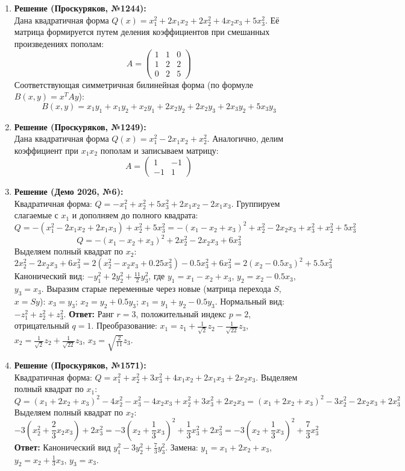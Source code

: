 \begin{enumerate}
    \item \textbf{Решение (Проскуряков, №1244):}\\
    Дана квадратичная форма $Q(x) = x_1^2 + 2x_1 x_2 + 2x_2^2 + 4x_2 x_3 + 5x_3^2$.
    Её матрица формируется путем деления коэффициентов при смешанных произведениях пополам:
    $$A = \begin{pmatrix} 1 & 1 & 0 \\ 1 & 2 & 2 \\ 0 & 2 & 5 \end{pmatrix}$$
    Соответствующая симметричная билинейная форма (по формуле $B(x,y) = x^T A y$):
    $$B(x,y) = x_1 y_1 + x_1 y_2 + x_2 y_1 + 2x_2 y_2 + 2x_2 y_3 + 2x_3 y_2 + 5x_3 y_3$$

    \item \textbf{Решение (Проскуряков, №1249):}\\
    Дана квадратичная форма $Q(x) = x_1^2 - 2x_1 x_2 + x_2^2$.
    Аналогично, делим коэффициент при $x_1 x_2$ пополам и записываем матрицу:
    $$A = \begin{pmatrix} 1 & -1 \\ -1 & 1 \end{pmatrix}$$

    \item \textbf{Решение (Демо 2026, №6):}\\
    Квадратичная форма: $Q = -x_1^2 + x_2^2 + 5x_3^2 + 2x_1 x_2 - 2x_1 x_3$.
    Группируем слагаемые с $x_1$ и дополняем до полного квадрата:
    $$Q = -(x_1^2 - 2x_1 x_2 + 2x_1 x_3) + x_2^2 + 5x_3^2 = -(x_1 - x_2 + x_3)^2 + x_2^2 - 2x_2 x_3 + x_3^2 + x_2^2 + 5x_3^2$$
    $$Q = -(x_1 - x_2 + x_3)^2 + 2x_2^2 - 2x_2 x_3 + 6x_3^2$$
    Выделяем полный квадрат по $x_2$:
    $$2x_2^2 - 2x_2 x_3 + 6x_3^2 = 2(x_2^2 - x_2 x_3 + 0.25x_3^2) - 0.5x_3^2 + 6x_3^2 = 2(x_2 - 0.5x_3)^2 + 5.5x_3^2$$
    Канонический вид: $-y_1^2 + 2y_2^2 + \frac{11}{2}y_3^2$, где $y_1 = x_1 - x_2 + x_3$, $y_2 = x_2 - 0.5x_3$, $y_3 = x_3$.
    Выразим старые переменные через новые (матрица перехода $S$, $x = Sy$):
    $x_3 = y_3$; \quad $x_2 = y_2 + 0.5y_3$; \quad $x_1 = y_1 + y_2 - 0.5y_3$.
    Нормальный вид: $-z_1^2 + z_2^2 + z_3^2$.
    \textbf{Ответ:} Ранг $r=3$, положительный индекс $p=2$, отрицательный $q=1$. Преобразование: $x_1 = z_1 + \frac{1}{\sqrt{2}}z_2 - \frac{1}{\sqrt{22}}z_3$, $x_2 = \frac{1}{\sqrt{2}}z_2 + \frac{1}{\sqrt{22}}z_3$, $x_3 = \sqrt{\frac{2}{11}}z_3$.

    \item \textbf{Решение (Проскуряков, №1571):}\\
    Квадратичная форма: $Q = x_1^2 + x_2^2 + 3x_3^2 + 4x_1 x_2 + 2x_1 x_3 + 2x_2 x_3$.
    Выделяем полный квадрат по $x_1$:
    $$Q = (x_1 + 2x_2 + x_3)^2 - 4x_2^2 - x_3^2 - 4x_2 x_3 + x_2^2 + 3x_3^2 + 2x_2 x_3 = (x_1 + 2x_2 + x_3)^2 - 3x_2^2 - 2x_2 x_3 + 2x_3^2$$
    Выделяем полный квадрат по $x_2$:
    $$-3(x_2^2 + \frac{2}{3}x_2 x_3) + 2x_3^2 = -3(x_2 + \frac{1}{3}x_3)^2 + \frac{1}{3}x_3^2 + 2x_3^2 = -3(x_2 + \frac{1}{3}x_3)^2 + \frac{7}{3}x_3^2$$
    \textbf{Ответ:} Канонический вид $y_1^2 - 3y_2^2 + \frac{7}{3}y_3^2$. Замена: $y_1 = x_1 + 2x_2 + x_3$, $y_2 = x_2 + \frac{1}{3}x_3$, $y_3 = x_3$.


\end{enumerate}
